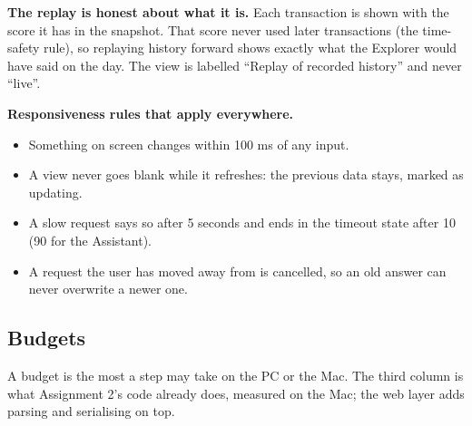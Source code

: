 \textbf{The replay is honest about what it is.} Each transaction is shown with the score it has in
the snapshot. That score never used later transactions (the time-safety rule), so replaying history
forward shows exactly what the Explorer would have said on the day. The view is labelled ``Replay of
recorded history'' and never ``live''.

\textbf{Responsiveness rules that apply everywhere.}
\begin{itemize}
  \item Something on screen changes within 100 ms of any input.
  \item A view never goes blank while it refreshes: the previous data stays, marked as updating.
  \item A slow request says so after 5 seconds and ends in the timeout state after 10 (90 for the
    Assistant).
  \item A request the user has moved away from is cancelled, so an old answer can never overwrite
    a newer one.
\end{itemize}

\subsection{Budgets}
\label{sec:budgets}

A budget is the most a step may take on the PC or the Mac. The third column is what Assignment 2's
code already does, measured on the Mac; the web layer adds parsing and serialising on top.

